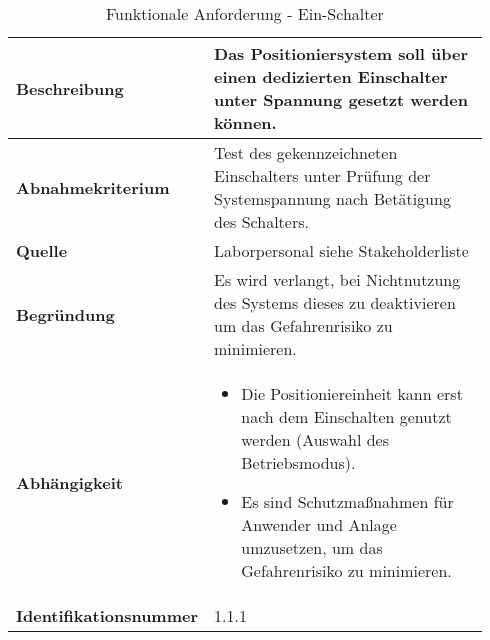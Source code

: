 \documentclass[../Bachelorarbeit.tex]{subfiles}
\begin{document}
\begin{table}[H]
    \centering
    \begin{tabular}{| p{0.34\linewidth} | p{0.6\linewidth} |}
        \hline
        \textbf{Beschreibung} & Das Positioniersystem soll über einen dedizierten Einschalter unter Spannung gesetzt werden können. \\ \hline
        \textbf{Abnahmekriterium} & Test des gekennzeichneten Einschalters unter Prüfung der Systemspannung nach Betätigung des Schalters. \\ \hline
        \textbf{Quelle} & Laborpersonal siehe Stakeholderliste \\ \hline
        \textbf{Begründung} & Es wird verlangt, bei Nichtnutzung des Systems dieses zu deaktivieren um das Gefahrenrisiko zu minimieren. \\ \hline
        \textbf{Abhängigkeit} & {\begin{itemize}[noitemsep,topsep=0pt,parsep=0pt,partopsep=0pt,leftmargin=*]
                                    \item Die Positioniereinheit kann erst nach dem Einschalten genutzt werden (Auswahl des Betriebsmodus).
                                    \item Es sind Schutzmaßnahmen für Anwender und Anlage umzusetzen, um das Gefahrenrisiko zu minimieren.
                                \end{itemize}} \\ \hline
        \textbf{Identifikationsnummer} & 1.1.1 \\ \hline
    \end{tabular}
    \caption[\acs{fa} - EIN-Schalter]{Funktionale Anforderung - Ein-Schalter}
    \label{tab:my-table}
\end{table}
\end{document}
